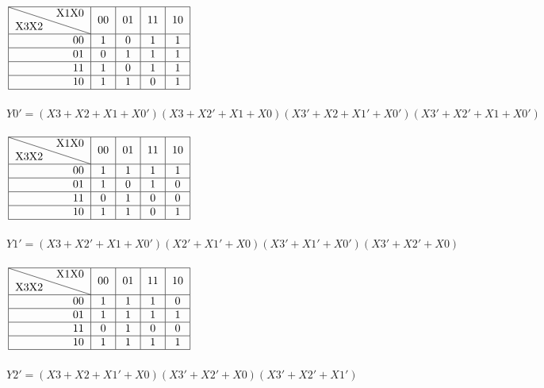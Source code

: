 \documentclass[12pt,a4paper,UTF8]{article}
\begin{document}
{\noindent$\left.
  \begin{tabular}[H]{|r|c|c|c|c|}
    \hline
    \diagbox{X3X2}{X1X0} & 00 & 01 & 11 & 10 \\ \hline
    00                   & 1  & 0  & 1  & 1  \\ \hline
    01                   & 0  & 1  & 1  & 1  \\ \hline
    11                   & 1  & 0  & 1  & 1  \\ \hline
    10                   & 1  & 1  & 0  & 1  \\ \hline
  \end{tabular}
  \right.$ \\ \\
$Y0' = (X3 + X2 + X1 + X0') (X3 + X2' + X1 + X0) %
  (X3' + X2 + X1' + X0') (X3' + X2' + X1 + X0')$
\\ \\
$\left.
  \begin{tabular}[H]{|r|c|c|c|c|}
    \hline
    \diagbox{X3X2}{X1X0} & 00 & 01 & 11 & 10 \\ \hline
    00                   & 1  & 1  & 1  & 1  \\ \hline
    01                   & 1  & 0  & 1  & 0  \\ \hline
    11                   & 0  & 1  & 0  & 0  \\ \hline
    10                   & 1  & 1  & 0  & 1  \\ \hline
  \end{tabular}
  \right.$\\ \\
$Y1' = (X3 + X2' + X1 + X0') (X2' + X1' + X0)%
  (X3' + X1' + X0') (X3' + X2' + X0)$
\\ \\
$\left.
  \begin{tabular}[H]{|r|c|c|c|c|}
    \hline
    \diagbox{X3X2}{X1X0} & 00 & 01 & 11 & 10 \\ \hline
    00                   & 1  & 1  & 1  & 0  \\ \hline
    01                   & 1  & 1  & 1  & 1  \\ \hline
    11                   & 0  & 1  & 0  & 0  \\ \hline
    10                   & 1  & 1  & 1  & 1  \\ \hline
  \end{tabular}
  \right.$\\ \\
$Y2' = (X3 + X2 + X1' + X0) (X3' + X2' + X0) (X3' + X2' + X1')$
\\ \\
}
\end{document}
